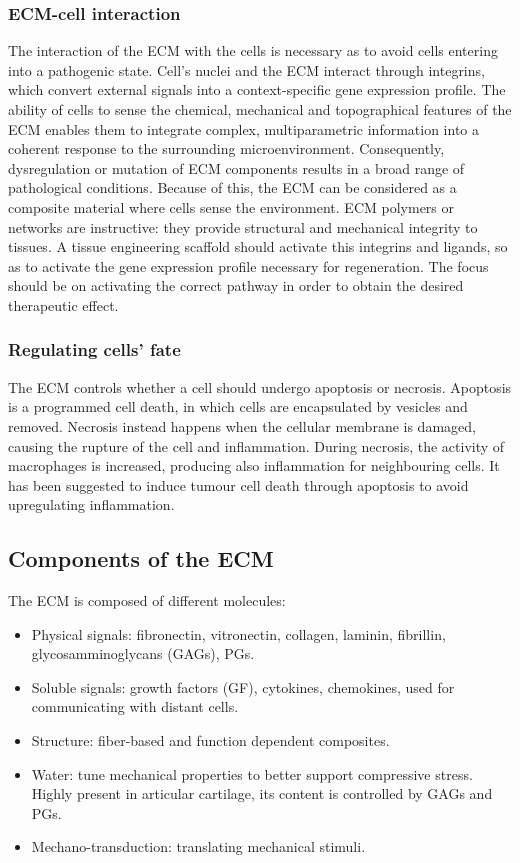 		\subsubsection{ECM-cell interaction}
		The interaction of the ECM with the cells is necessary as to avoid cells entering into a pathogenic state.
		Cell's nuclei and the ECM interact through integrins, which convert external signals into a context-specific gene expression profile.
		The ability of cells to sense the chemical, mechanical and topographical features of the ECM enables them to integrate complex, multiparametric information into a coherent response to the surrounding microenvironment.
		Consequently, dysregulation or mutation of ECM components results in a broad range of pathological conditions.
		Because of this, the ECM can be considered as a composite material where cells sense the environment.
		ECM polymers or networks are instructive: they provide structural and mechanical integrity to tissues.
		A tissue engineering scaffold should activate this integrins and ligands, so as to activate the gene expression profile necessary for regeneration.
		The focus should be on activating the correct pathway in order to obtain the desired therapeutic effect.

		\subsubsection{Regulating cells' fate}
		The ECM controls whether a cell should undergo apoptosis or necrosis.
		Apoptosis is a programmed cell death, in which cells are encapsulated by vesicles and removed.
		Necrosis instead happens when the cellular membrane is damaged, causing the rupture of the cell and inflammation.
		During necrosis, the activity of macrophages is increased, producing also inflammation for neighbouring cells.
		It has been suggested to induce tumour cell death through apoptosis to avoid upregulating inflammation.

	\subsection{Components of the ECM}
	The ECM is composed of different molecules:

	\begin{multicols}{2}
		\begin{itemize}
			\item Physical signals: fibronectin, vitronectin, collagen, laminin, fibrillin, glycosamminoglycans (GAGs), PGs.
			\item Soluble signals: growth factors (GF), cytokines, chemokines, used for communicating with distant cells.
			\item Structure: fiber-based and function dependent composites.
			\item Water: tune mechanical properties to better support compressive stress.
				Highly present in articular cartilage, its content is controlled by GAGs and PGs.
			\item Mechano-transduction: translating mechanical stimuli.
		\end{itemize}
	\end{multicols}

